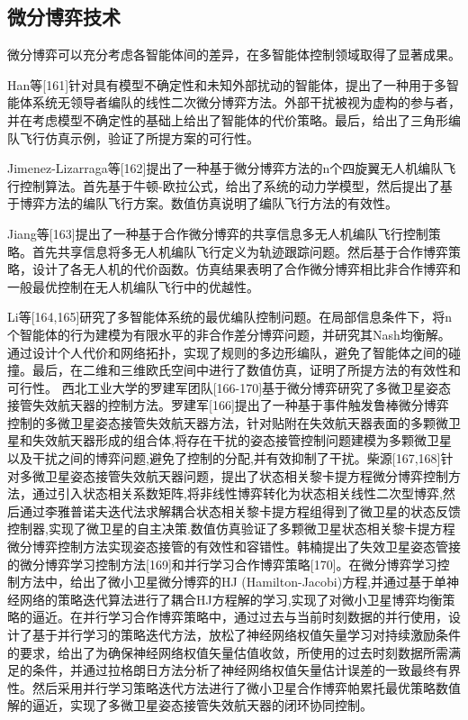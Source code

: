 \subsection{微分博弈技术}
微分博弈可以充分考虑各智能体间的差异，在多智能体控制领域取得了显著成果。

Han等[161]针对具有模型不确定性和未知外部扰动的智能体，提出了一种用于多智能体系统无领导者编队的线性二次微分博弈方法。外部干扰被视为虚构的参与者，并在考虑模型不确定性的基础上给出了智能体的代价策略。最后，给出了三角形编队飞行仿真示例，验证了所提方案的可行性。

Jimenez-Lizarraga等[162]提出了一种基于微分博弈方法的n个四旋翼无人机编队飞行控制算法。首先基于牛顿-欧拉公式，给出了系统的动力学模型，然后提出了基于博弈方法的编队飞行方案。数值仿真说明了编队飞行方法的有效性。

Jiang等[163]提出了一种基于合作微分博弈的共享信息多无人机编队飞行控制策略。首先共享信息将多无人机编队飞行定义为轨迹跟踪问题。然后基于合作博弈策略，设计了各无人机的代价函数。仿真结果表明了合作微分博弈相比非合作博弈和一般最优控制在无人机编队飞行中的优越性。

Li等[164,165]研究了多智能体系统的最优编队控制问题。在局部信息条件下，将n个智能体的行为建模为有限水平的非合作差分博弈问题，并研究其Nash均衡解。通过设计个人代价和网络拓扑，实现了规则的多边形编队，避免了智能体之间的碰撞。最后，在二维和三维欧氏空间中进行了数值仿真，证明了所提方法的有效性和可行性。
西北工业大学的罗建军团队[166-170]基于微分博弈研究了多微卫星姿态接管失效航天器的控制方法。罗建军[166]提出了一种基于事件触发鲁棒微分博弈控制的多微卫星姿态接管失效航天器方法，针对贴附在失效航天器表面的多颗微卫星和失效航天器形成的组合体,将存在干扰的姿态接管控制问题建模为多颗微卫星以及干扰之间的博弈问题,避免了控制的分配,并有效抑制了干扰。柴源[167,168]针对多微卫星姿态接管失效航天器问题，提出了状态相关黎卡提方程微分博弈控制方法，通过引入状态相关系数矩阵,将非线性博弈转化为状态相关线性二次型博弈,然后通过李雅普诺夫迭代法求解耦合状态相关黎卡提方程组得到了微卫星的状态反馈控制器,实现了微卫星的自主决策.数值仿真验证了多颗微卫星状态相关黎卡提方程微分博弈控制方法实现姿态接管的有效性和容错性。韩楠提出了失效卫星姿态管接的微分博弈学习控制方法[169]和并行学习合作博弈策略[170]。在微分博弈学习控制方法中，给出了微小卫星微分博弈的HJ (Hamilton-Jacobi)方程,并通过基于单神经网络的策略迭代算法进行了耦合HJ方程解的学习,实现了对微小卫星博弈均衡策略的逼近。在并行学习合作博弈策略中，通过过去与当前时刻数据的并行使用，设计了基于并行学习的策略迭代方法，放松了神经网络权值矢量学习对持续激励条件的要求，给出了为确保神经网络权值矢量估值收敛，所使用的过去时刻数据所需满足的条件，并通过拉格朗日方法分析了神经网络权值矢量估计误差的一致最终有界性。然后采用并行学习策略迭代方法进行了微小卫星合作博弈帕累托最优策略数值解的逼近，实现了多微卫星姿态接管失效航天器的闭环协同控制。

